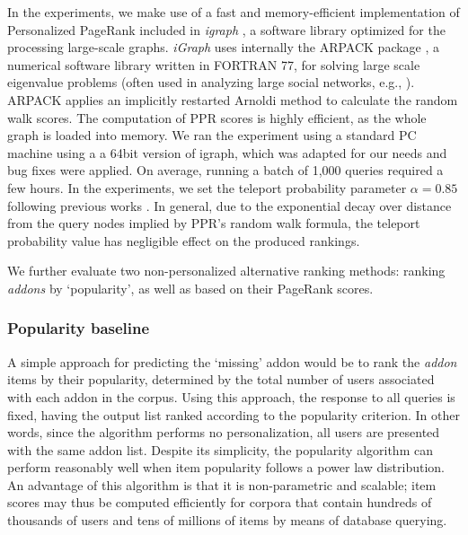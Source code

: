 \documentclass[11pt,oneside]{book}
\let\Oldsubsubsection\subsubsection
\renewcommand{\subsubsection}{\FloatBarrier\Oldsubsubsection}
\begin{document}
In the experiments, we make use of a fast and memory-efficient implementation of Personalized PageRank included in {\it igraph} \citep{igraph}, a software library optimized for the processing large-scale graphs. {\it iGraph} uses internally the ARPACK package \citep{lehoucq1998arpack}, a numerical software library written in FORTRAN 77, for solving large scale eigenvalue problems (often used in analyzing large social networks, e.g., \citep{ting2004minig}). ARPACK applies an implicitly restarted Arnoldi method to calculate the random walk scores. The computation of PPR scores is highly efficient, as the whole graph is loaded into memory. We ran the experiment using a standard PC machine using a a 64bit version of igraph, which was adapted for our needs and bug fixes were applied. On average, running a batch of 1,000 queries required a few hours. In the experiments, we set the teleport probability parameter $\alpha=0.85$ following previous works \citep{boldi2005totalrank}. In general, due to the exponential decay over distance from the query nodes implied by PPR's random walk formula, the teleport probability value has negligible effect on the produced rankings.

We further evaluate two non-personalized alternative ranking methods: ranking {\it addons} by `popularity', as well as based on their PageRank scores. 

\subsubsection{Popularity baseline} 

A simple approach for predicting the `missing' addon would be to rank the {\it addon} items by their popularity, determined by the total number of users associated with each addon in the corpus. Using this approach, the response to all queries is fixed, having the output list ranked according to the popularity criterion. In other words, since the algorithm performs no personalization, all users are presented with the same
addon list. Despite its simplicity, the popularity algorithm can perform reasonably well when item popularity follows a power law distribution. An advantage of this algorithm is that it is non-parametric and scalable; item scores may thus be computed efficiently for corpora that contain hundreds of thousands of users and tens of millions of items by means of database querying. 
\end{document}
